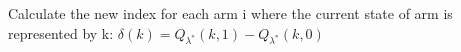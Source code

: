 \documentclass{slides}
\begin{document}
{{\begin{algorithm}[H]
\begin{small}
\begin{algorithmic}[1]
                
    \EndFor
    \State Calculate the new index for each arm i where the current state of arm is represented by k:
        \Statex\hspace*{5mm} $\delta(k)=Q_{\lambda^*}(k,1)-Q_{\lambda^*}(k,0)$
\end{algorithmic}
\end{small}
\end{algorithm}

}}
\end{document}

